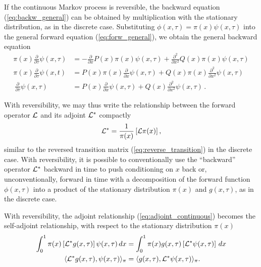 \documentclass[preprint]{elsarticle}
\begin{document}
If the continuous Markov process is reversible, the backward equation (\ref{eq:backw_general}) can be obtained by multiplication with the stationary distribution, as in the discrete case. Substituting $\phi(x,\tau)=\pi(x)\psi(x,\tau)$ into the general forward equation (\ref{eq:forw_general}), we obtain the general backward equation
\begin{equation}
\begin{split}
\pi(x)\frac{\partial}{\partial \tau} \psi(x,\tau)&=-\frac{\partial}{\partial x}P(x)\pi(x)\psi(x,\tau)+\frac{\partial^2}{\partial x^2}Q(x)\pi(x) \psi(x,\tau)\\
\pi(x)\frac{\partial}{\partial \tau}\psi(x,t)&=P(x)\pi(x)\frac{\partial}{\partial x}\psi(x,\tau) +Q(x)\pi(x)\frac{\partial^2}{\partial x^2}\psi(x,\tau)\\\
\frac{\partial}{\partial \tau}\psi(x,\tau)&=P(x)\frac{\partial}{\partial x}\psi(x,\tau)+Q(x)\frac{\partial^2}{\partial x^2}\psi(x,\tau)\,.
\end{split}
\end{equation}

With reversibility, we may thus write the relationship between the forward operator ${\cal L}$ and its adjoint ${\cal L}^{*}$ compactly
\begin{equation}\label{compact}
{\cal L}^{*}=\frac1{\pi(x)}\left[{\cal L}\pi(x)\right],
\end{equation}
similar to the reversed transition matrix (\ref{eq:reverse_transition}) in the discrete case. With reversibility, it is possible to conventionally use the ``backward'' operator ${\cal L}^{*}$ backward in time to push conditioning on $x$ back or, unconventionally, forward in time with a decomposition of the forward function  $\phi(x,\tau)$ into a product of the stationary distribution $\pi(x)$ and $g(x,\tau)$, as in the discrete case.

With reversibility, the adjoint relationship (\ref{eq:adjoint_continuous}) becomes the self-adjoint relationship, with respect to the stationary distribution $\pi(x)$ \citep{Song12}
\begin{equation}\label{eq:selfadjoint}
\begin{split}
\int_0^1 \pi(x) \left[{\cal L}^{*} g(x,\tau)\right]\psi(x,\tau)\,dx&=
\int_0^1  \pi(x)g(x,\tau)\left[{\cal L}^{*} \psi(x,\tau)\right]\,dx\\
\langle {\cal L}^{*} g(x,\tau),\psi(x,\tau) \rangle_{\pi}&=\langle g(x,\tau),{\cal L}^{*} \psi(x,\tau) \rangle_{\pi}.
\end{split}
\end{equation}
\end{document}
